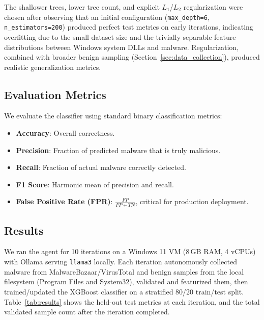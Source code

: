 \documentclass[12pt,a4paper]{article}
\begin{document}
The shallower trees, lower tree count, and explicit $L_1$/$L_2$ regularization were chosen after observing that an initial configuration (\texttt{max\_depth=6}, \texttt{n\_estimators=200}) produced perfect test metrics on early iterations, indicating overfitting due to the small dataset size and the trivially separable feature distributions between Windows system DLLs and malware. Regularization, combined with broader benign sampling (Section~\ref{sec:data_collection}), produced realistic generalization metrics.

\subsection{Evaluation Metrics}

We evaluate the classifier using standard binary classification metrics:

\begin{itemize}
    \item \textbf{Accuracy}: Overall correctness.
    \item \textbf{Precision}: Fraction of predicted malware that is truly malicious.
    \item \textbf{Recall}: Fraction of actual malware correctly detected.
    \item \textbf{F1 Score}: Harmonic mean of precision and recall.
    \item \textbf{False Positive Rate (FPR)}: $\frac{FP}{FP + TN}$, critical for production deployment.
\end{itemize}

\subsection{Results}

We ran the agent for 10 iterations on a Windows 11 VM (8\,GB RAM, 4 vCPUs) with Ollama serving \texttt{llama3} locally. Each iteration autonomously collected malware from MalwareBazaar/VirusTotal and benign samples from the local filesystem (Program Files and System32), validated and featurized them, then trained/updated the XGBoost classifier on a stratified 80/20 train/test split. Table~\ref{tab:results} shows the held-out test metrics at each iteration, and the total validated sample count after the iteration completed.
\end{document}
